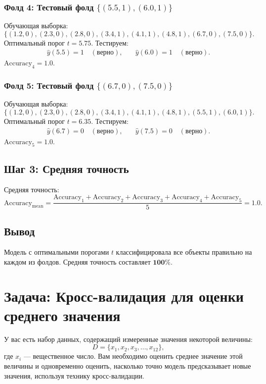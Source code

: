 \subsubsection*{Фолд 4: Тестовый фолд \(\{(5.5, 1), (6.0, 1)\}\)}
Обучающая выборка:
\[
\{(1.2, 0), (2.3, 0), (2.8, 0), (3.4, 1), (4.1, 1), (4.8, 1), (6.7, 0), (7.5, 0)\}.
\]
Оптимальный порог \( t = 5.75 \). Тестируем:
\[
\begin{aligned}
\hat{y}(5.5) = 1 \quad (\text{верно}), & \quad \hat{y}(6.0) = 1 \quad (\text{верно}).
\end{aligned}
\]
\(\text{Accuracy}_4 = 1.0\).

\subsubsection*{Фолд 5: Тестовый фолд \(\{(6.7, 0), (7.5, 0)\}\)}
Обучающая выборка:
\[
\{(1.2, 0), (2.3, 0), (2.8, 0), (3.4, 1), (4.1, 1), (4.8, 1), (5.5, 1), (6.0, 1)\}.
\]
Оптимальный порог \( t = 6.35 \). Тестируем:
\[
\begin{aligned}
\hat{y}(6.7) = 0 \quad (\text{верно}), & \quad \hat{y}(7.5) = 0 \quad (\text{верно}).
\end{aligned}
\]
\(\text{Accuracy}_5 = 1.0\).

\subsection*{Шаг 3: Средняя точность}
Средняя точность:
\[
\text{Accuracy}_{\text{mean}} = \frac{\text{Accuracy}_1 + \text{Accuracy}_2 + \text{Accuracy}_3 + \text{Accuracy}_4 + \text{Accuracy}_5}{5} = 1.0.
\]

\subsection*{Вывод}
Модель с оптимальными порогами \( t \) классифицировала все объекты правильно на каждом из фолдов. Средняя точность составляет \( \mathbf{100\%} \).


\section*{Задача: Кросс-валидация для оценки среднего значения}

У вас есть набор данных, содержащий измеренные значения некоторой величины:
\[
D = \{ x_1, x_2, x_3, \dots, x_{12} \},
\]
где \(x_i\) — вещественное число. Вам необходимо оценить среднее значение этой величины и одновременно оценить, насколько точно модель предсказывает новые значения, используя технику кросс-валидации.


